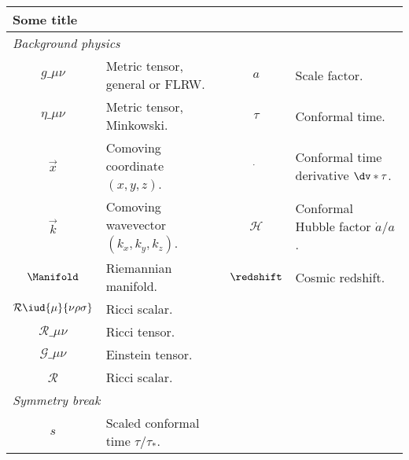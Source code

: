 \begin{table}
    \begin{minipage}{\linewidth}
        {\small{
        \begin{tabular*}{\linewidth}{c l c l}
            \multicolumn{4}{l}{\textsf{Some title}} \\
            \toprule
            \multicolumn{4}{l}{\textit{Background physics}}  \\
            \midrule
 
            $g\_{\mu\nu}$    & Metric tensor, general or FLRW. &
            $a$ &{Scale factor.} \\

            $\eta\_{\mu\nu}$    & Metric tensor, Minkowski. &
            $\tau$ & Conformal time. \\
            $\vec{x}$ & Comoving coordinate $(x,y,z)$. 
            & $\dot{}$ & Conformal time derivative $\dv*{}{\tau}$.\\
            $\vec{k}$ & Comoving wavevector $(k_x,k_y,k_z)$. &
            $\mathcal{H}$ & Conformal Hubble factor $\dot{a}/a$.  \\
            $\Manifold$ & Riemannian manifold. &
            $\redshift$ & Cosmic redshift. \\
            $\mathcal{R}\iud{\mu}{\nu\rho\sigma}$& Ricci scalar. & & \\
            $\mathcal{R}\_{\mu\nu}$& Ricci tensor.& &  \\
            $\mathcal{G}\_{\mu\nu}$& Einstein tensor. & & \\
            $\mathcal{R}$& Ricci scalar. & & \\
    
            \midrule
            \multicolumn{4}{l}{\textit{Symmetry break}}  \\
            \midrule
            $s$ & Scaled conformal time $\tau/\tau_\ast$. & & \\



            \bottomrule
        \end{tabular*}
        }}
    \end{minipage}
    \caption{}
\end{table}









